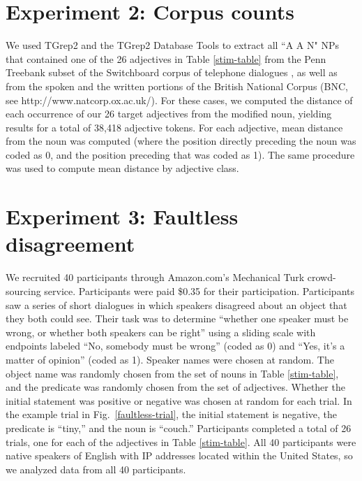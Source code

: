 \documentclass{pnastwo}
\newcommand{\tableref}[1]{Table \ref{#1}}
\newcommand{\figref}[1]{Fig.~\ref{#1}}
\begin{document}
\begin{article}
\begin{materials}



\section{Experiment 2: Corpus counts} 
We used TGrep2 \cite{rohde2005} and the TGrep2 Database Tools \cite{degenjaeger-tdt} to extract all ``A A N"  NPs that contained one of the 26 adjectives in Table \ref{stim-table} from the Penn Treebank subset of the Switchboard corpus of telephone dialogues \cite{godfrey1992}, as well as from the spoken and the written portions of the British National Corpus (BNC, see http://www.natcorp.ox.ac.uk/). For these cases, we computed the distance of each occurrence of our 26 target adjectives from the modified noun, yielding results for a total of 38,418 adjective tokens.  For each adjective, mean distance from the noun was computed (where the position directly preceding the noun was coded as 0, and the position preceding that was coded as 1). The same procedure was used to compute mean distance by adjective class.

\section{Experiment 3: Faultless disagreement}
We recruited 40 participants through Amazon.com's Mechanical Turk crowd-sourcing service. Participants were paid \$0.35 for their participation. Participants saw a series of short dialogues in which speakers disagreed about an object that they both could see.  Their task was to determine ``whether one speaker must be wrong, or whether both speakers can be right'' using a sliding scale with endpoints labeled ``No, somebody must be wrong'' (coded as 0)  and ``Yes, it's a matter of opinion'' (coded as 1). Speaker names were chosen at random. The object name was randomly chosen from the set of nouns in Table \ref{stim-table}, and the predicate was randomly chosen from the set of adjectives. Whether the initial statement was positive or negative was chosen at random for each trial. In the example trial in Fig.~\ref{faultless-trial}, the initial statement is negative, the predicate is ``tiny,'' and the noun is ``couch.'' Participants completed a total of 26 trials, one for each of the adjectives in Table \ref{stim-table}.
All 40 participants were native speakers of English with IP addresses located within the United States, so we analyzed data from all 40 participants.


\end{materials}
\end{article}
\end{document}
